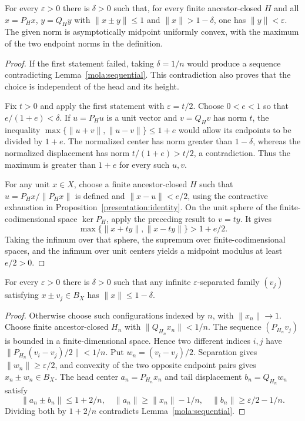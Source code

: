 \begin{corollary}\label{mola:uniform-sequential}
For every $\varepsilon>0$ there is $\delta>0$ such that, for every
finite ancestor-closed $H$ and all $x=P_Hx$, $y=Q_Hy$ with
$\|x\pm y\|\le1$ and $\|x\|>1-\delta$, one has $\|y\|<\varepsilon$.
The given norm is asymptotically midpoint uniformly convex, with the
maximum of the two endpoint norms in the definition.
\end{corollary}
\begin{proof}
If the first statement failed, taking $\delta=1/n$ would produce a
sequence contradicting Lemma~\ref{mola:sequential}.  This contradiction
also proves that the choice is independent of the head and its height.

Fix $t>0$ and apply the first statement with $\varepsilon=t/2$.
Choose $0<e<1$ so that $e/(1+e)<\delta$.  If $u=P_Hu$ is a unit vector
and $v=Q_Hv$ has norm $t$, the inequality
$\max\{\|u+v\|,\|u-v\|\}\le1+e$ would allow its endpoints to be
divided by $1+e$.  The normalized center has norm greater than
$1-\delta$, whereas the normalized displacement has norm
$t/(1+e)>t/2$, a contradiction.  Thus the maximum is greater than
$1+e$ for every such $u,v$.

For any unit $x\in X$, choose a finite ancestor-closed $H$ such that
$u=P_Hx/\|P_Hx\|$ is defined and $\|x-u\|<e/2$, using the
contractive exhaustion in Proposition~\ref{presentation:identity}.  On the unit sphere of the
finite-codimensional space $\ker P_H$, apply the preceding result to
$v=ty$.  It gives
\[
 \max\{\|x+ty\|,\|x-ty\|\}>1+e/2.
\]
Taking the infimum over that sphere, the supremum over
finite-codimensional spaces, and the infimum over unit centers yields
a midpoint modulus at least $e/2>0$.
\end{proof}

\begin{corollary}\label{mola:separated-sequential}
For every $\varepsilon>0$ there is $\delta>0$ such that any infinite
$\varepsilon$-separated family $(v_j)$ satisfying $x\pm v_j\in B_X$
has $\|x\|\le1-\delta$.
\end{corollary}
\begin{proof}
Otherwise choose such configurations indexed by $n$, with
$\|x_n\|\to1$.  Choose finite ancestor-closed $H_n$ with
$\|Q_{H_n}x_n\|<1/n$.  The sequence $(P_{H_n}v_j)$ is bounded in a
finite-dimensional space.  Hence two different indices $i,j$ have
$\|P_{H_n}(v_i-v_j)/2\|<1/n$.  Put
$w_n=(v_i-v_j)/2$.  Separation gives $\|w_n\|\ge\varepsilon/2$, and
convexity of the two opposite endpoint pairs gives $x_n\pm w_n\in B_X$.
The head center $a_n=P_{H_n}x_n$ and tail displacement
$b_n=Q_{H_n}w_n$ satisfy
\[
 \|a_n\pm b_n\|\le1+2/n,\quad
 \|a_n\|\ge\|x_n\|-1/n,\quad
 \|b_n\|\ge\varepsilon/2-1/n.
\]
Dividing both by $1+2/n$ contradicts Lemma~\ref{mola:sequential}.
\end{proof}

